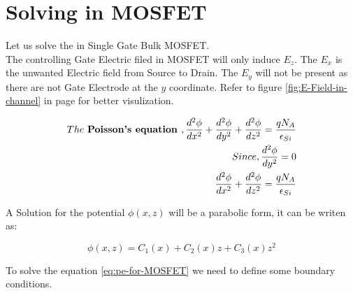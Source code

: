 \documentclass[a4paper]{article}
\begin{document}
\section{Solving \PE in MOSFET}

Let us solve the \PE in Single Gate Bulk MOSFET.\\

The controlling Gate Electric filed in MOSFET will only induce $E_z$. The $E_x$ is the unwanted Electric field from Source to Drain. The $E_y$ will not be present as there are not Gate Electrode at the $y$ coordinate. Refer to figure \ref{fig:E-Field-in-channel} in page \pageref{fig:E-Field-in-channel} for better visulization.


\begin{align*}
  The~\textbf{Poisson's equation }, \frac {d^2\phi} {dx^2} + \frac {d^2\phi} {dy^2} + \frac {d^2\phi} {dz^2} = \frac{qN_A} {\epsilon_{Si}}\\
  Since, \frac {d^2\phi} {dy^2} = 0\\
  \frac {d^2\phi} {dx^2} + \frac {d^2\phi} {dz^2} = \frac{qN_A} {\epsilon_{Si}}
\end{align*}

A Solution for the potential $\phi(x,z)$ will be a parabolic form, it can be writen as:

\begin{equation}
  \label{eq:pe-for-MOSFET}
  \phi(x,z) = C_1(x) + C_2(x)z  + C_3(x)z^2
\end{equation}

To solve the equation \ref{eq:pe-for-MOSFET} we need to define some boundary conditions.
\end{document}
